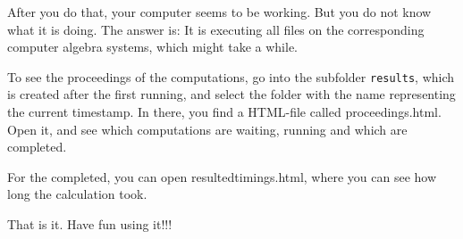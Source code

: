 \documentclass[11pt,a4paper]{amsart}
\numberwithin{equation}{section}
\theoremstyle{definition}
\begin{document}
After you do that, your computer seems to be working. But you do not know what it is doing. The answer is: It is executing all files on the corresponding computer algebra systems, which might take a while.

To see the proceedings of the computations, go into the subfolder \texttt{results}, which is created after the first running, and select the folder with the name representing the current timestamp. In there, you find a HTML-file called proceedings.html. Open it, and see which computations are waiting, running and which are completed.

For the completed, you can open resultedtimings.html, where you can see how long the calculation took.

That is it. Have fun using it!!!
\end{document}
